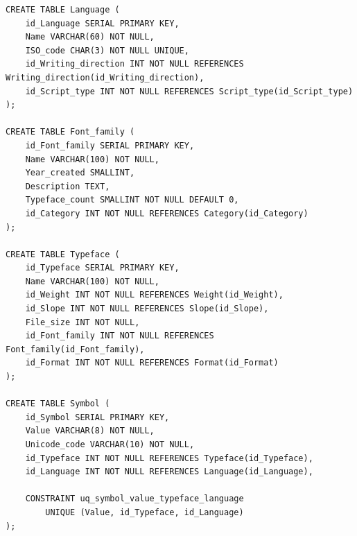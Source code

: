 \begin{verbatim}
CREATE TABLE Language (
    id_Language SERIAL PRIMARY KEY,
    Name VARCHAR(60) NOT NULL,
    ISO_code CHAR(3) NOT NULL UNIQUE,
    id_Writing_direction INT NOT NULL REFERENCES Writing_direction(id_Writing_direction),
    id_Script_type INT NOT NULL REFERENCES Script_type(id_Script_type)
);

CREATE TABLE Font_family (
    id_Font_family SERIAL PRIMARY KEY,
    Name VARCHAR(100) NOT NULL,
    Year_created SMALLINT,
    Description TEXT,
    Typeface_count SMALLINT NOT NULL DEFAULT 0,
    id_Category INT NOT NULL REFERENCES Category(id_Category)
);

CREATE TABLE Typeface (
    id_Typeface SERIAL PRIMARY KEY,
    Name VARCHAR(100) NOT NULL,
    id_Weight INT NOT NULL REFERENCES Weight(id_Weight),
    id_Slope INT NOT NULL REFERENCES Slope(id_Slope),
    File_size INT NOT NULL,
    id_Font_family INT NOT NULL REFERENCES Font_family(id_Font_family),
    id_Format INT NOT NULL REFERENCES Format(id_Format)
);

CREATE TABLE Symbol (
    id_Symbol SERIAL PRIMARY KEY,
    Value VARCHAR(8) NOT NULL,
    Unicode_code VARCHAR(10) NOT NULL,
    id_Typeface INT NOT NULL REFERENCES Typeface(id_Typeface),
    id_Language INT NOT NULL REFERENCES Language(id_Language),

    CONSTRAINT uq_symbol_value_typeface_language
        UNIQUE (Value, id_Typeface, id_Language)
);
\end{verbatim}
